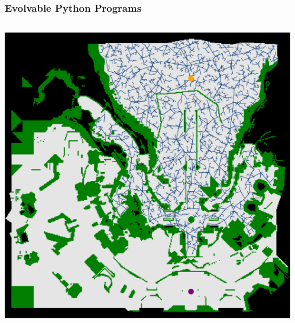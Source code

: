 \documentclass[aspectratio=169]{beamer}
\begin{document}
\begin{frame}[fragile]\frametitle{Evolvable Python Programs}
  \begin{columns}
      \begin{column}{.5\linewidth}
          \includegraphics[width=1.0\linewidth]{figures/da_one_off.pdf}
      \end{column}
      \begin{column}{.5\linewidth}
          
      \end{column}
  \end{columns}
\end{frame}
\end{document}
